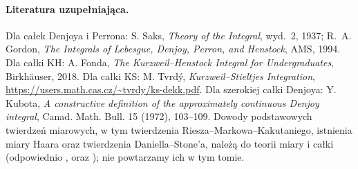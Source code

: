 \paragraph{Literatura uzupełniająca.}
Dla całek Denjoya i Perrona: S. Saks, \emph{Theory of the Integral},
wyd.~2, 1937; R.~A. Gordon, \emph{The Integrals of Lebesgue,
Denjoy, Perron, and Henstock}, AMS, 1994.
Dla całki KH: A. Fonda, \emph{The Kurzweil--Henstock Integral for
Undergraduates}, Birkh\"auser, 2018.
Dla całki KS: M. Tvrd\'y, \emph{Kurzweil--Stieltjes Integration}, \url{https://users.math.cas.cz/~tvrdy/ks-dekk.pdf}.
Dla szerokiej całki Denjoya: Y. Kubota, \emph{A constructive definition
of the approximately continuous Denjoy integral}, Canad. Math. Bull.
15 (1972), 103--109.
Dowody podstawowych twierdzeń miarowych, w tym twierdzenia
Riesza--Markowa--Kakutaniego, istnienia miary Haara oraz
twierdzenia Daniella--Stone'a, należą do teorii miary i całki
(odpowiednio
,
 oraz
);
nie powtarzamy ich w tym tomie.
\endgroup
